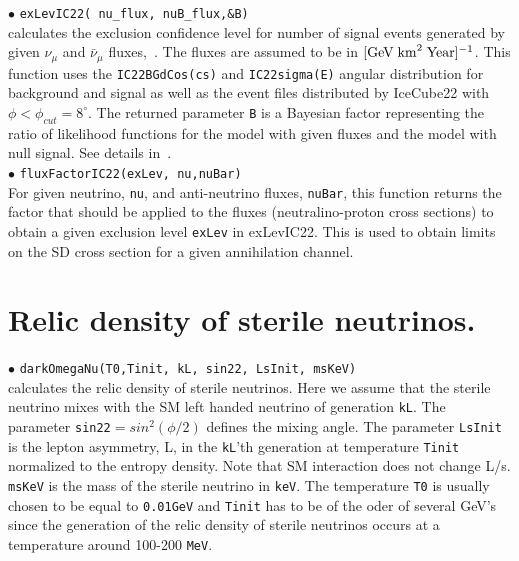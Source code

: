 \documentclass[12pt,a4paper]{article}
\begin{document}
\noindent
$\bullet$ \verb|exLevIC22( nu_flux, nuB_flux,&B)|\\
 calculates the  exclusion confidence  level  for number of signal events 
generated by  given $\nu_{\mu}$ and  
$\bar{\nu}_{\mu}$  fluxes,~\cite{Belanger:2015hra}. The fluxes are assumed to be in
$[\rm{GeV\;km}^2\;\rm{Year}]^{-1}$.  This function uses
the \verb|IC22BGdCos(cs)| and \verb|IC22sigma(E)| angular distribution for background and 
signal as well as the event files distributed  by IceCube22 
with  $\phi<\phi_{cut}=8^{\circ} $.  The returned parameter \verb|B| is a
Bayesian  factor representing the ratio of likelihood functions for the  model
with  given fluxes and the model  with null signal.  See details in~\cite{Belanger:2015hra}.\\
\noindent  
$\bullet$ \verb|fluxFactorIC22(exLev, nu,nuBar)|\\
For given neutrino, \verb|nu|, and anti-neutrino fluxes, \verb|nuBar|, 
this function returns the factor that should be applied to the 
fluxes (neutralino-proton   cross sections)  to obtain a given exclusion
level {\tt exLev}  in exLevIC22. This is used to obtain  limits on the SD cross 
section for a given annihilation channel.

\section{ Relic density of sterile neutrinos.}
$\bullet$ \verb|darkOmegaNu(T0,Tinit, kL, sin22, LsInit, msKeV)| \\
calculates the relic density of sterile neutrinos. Here we assume that the sterile neutrino mixes with the SM  
left handed neutrino  of generation {\tt kL}. The parameter {\tt sin22}$=sin^2(\phi/2)$ defines the mixing angle. 
The parameter {\tt LsInit} is the lepton asymmetry, L,  in the {\tt kL}'th  generation   at temperature {\tt Tinit} normalized to  
the entropy density.  
Note  that SM interaction does not change L/s. {\tt msKeV} is the mass of the sterile neutrino in 
{\tt keV}.  
The temperature {\tt T0} is usually  chosen to be equal to {\tt 0.01GeV} and {\tt Tinit} has to be 
of the oder of  several GeV's 
since the  generation  of the relic density of sterile neutrinos  occurs at  a temperature  around 100-200 {\tt MeV}.    
\end{document}
